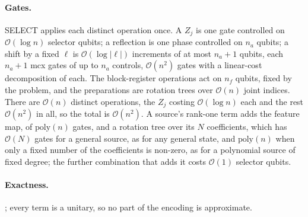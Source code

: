 \paragraph{Gates.} SELECT applies each distinct operation once. A $Z_j$ is one gate controlled on $\mathcal{O}(\log n)$ selector qubits; a reflection is one phase controlled on $n_a$ qubits; a shift by a fixed $\ell$ is $\mathcal{O}(\log|\ell|)$ increments of at most $n_a+1$ qubits, each $n_a+1$ \gls{mcx} gates of up to $n_a$ controls, $\mathcal{O}(n^2)$ gates with a linear-cost decomposition of each. The block-register operations act on $n_f$ qubits, fixed by the problem, and the preparations are rotation trees over $\mathcal{O}(n)$ joint indices. There are $\mathcal{O}(n)$ distinct operations, the $Z_j$ costing $\mathcal{O}(\log n)$ each and the rest $\mathcal{O}(n^2)$ in all, so the total is $\mathcal{O}(n^2)$. A source's rank-one term adds the feature map, of $\mathrm{poly}(n)$ gates, and a rotation tree over its $N$ coefficients, which has $\mathcal{O}(N)$ gates for a general source, as for any general state, and $\mathrm{poly}(n)$ when only a fixed number of the coefficients is non-zero, as for a polynomial source of fixed degree; the further combination that adds it costs $\mathcal{O}(1)$ selector qubits.

\paragraph{Exactness.} ; every term is a unitary, so no part of the encoding is approximate.

